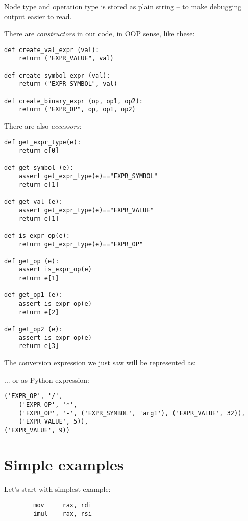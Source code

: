 ﻿\documentclass[12pt]{article}
\begin{document}
Node type and operation type is stored as plain string -- to make debugging output easier to read.

There are \textit{constructors} in our code, in \ac{OOP} sense, like these:

\begin{lstlisting}
def create_val_expr (val):
    return ("EXPR_VALUE", val)

def create_symbol_expr (val):
    return ("EXPR_SYMBOL", val)

def create_binary_expr (op, op1, op2):
    return ("EXPR_OP", op, op1, op2)
\end{lstlisting}

There are also \textit{accessors}:

\begin{lstlisting}
def get_expr_type(e):
    return e[0]

def get_symbol (e):
    assert get_expr_type(e)=="EXPR_SYMBOL"
    return e[1]

def get_val (e):
    assert get_expr_type(e)=="EXPR_VALUE"
    return e[1]

def is_expr_op(e):
    return get_expr_type(e)=="EXPR_OP"

def get_op (e):
    assert is_expr_op(e)
    return e[1]

def get_op1 (e):
    assert is_expr_op(e)
    return e[2]

def get_op2 (e):
    assert is_expr_op(e)
    return e[3]
\end{lstlisting}

The conversion expression we just saw will be represented as:



... or as Python expression:

\begin{lstlisting}
('EXPR_OP', '/', 
	('EXPR_OP', '*',
	('EXPR_OP', '-', ('EXPR_SYMBOL', 'arg1'), ('EXPR_VALUE', 32)), 
	('EXPR_VALUE', 5)), 
('EXPR_VALUE', 9))
\end{lstlisting}

\section{Simple examples}

Let's start with simplest example:

\begin{lstlisting}
        mov     rax, rdi
        imul    rax, rsi
\end{lstlisting}
\end{document}
